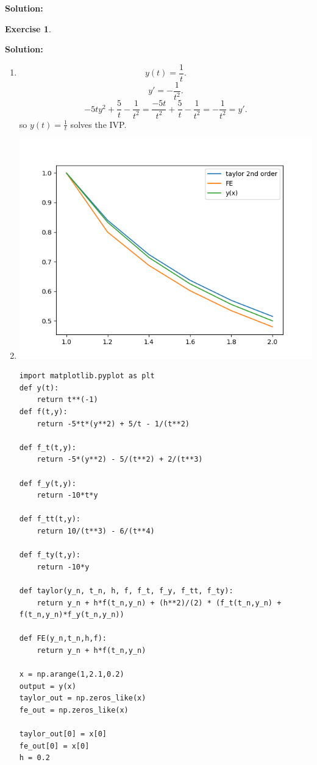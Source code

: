 \documentclass[a4paper,12pt]{scrartcl} %
\newenvironment{solution}
  {\par\color{answercolor}\textbf{Solution:}\ }
  {\par}
\newcounter{customcounter}
\theoremstyle{darktheorem}
\newtheorem{exercise}[customcounter]{Exercise}
\begin{document}
\begin{solution}
\begin{exercise}
    \end{exercise}
    \begin{solution}
        \begin{enumerate}
            \item
            \[
           y(t) = \frac{1}{t}
           .\]  
           \[
           y' = -\frac{1}{t^2}
           .\] 
           \[
           -5ty^2 + \frac{5}{t} -\frac{1}{t^2} = \frac{-5t}{t^2} + \frac{5}{t} -\frac{1}{t^2} = -\frac{1}{t^2} = y'
           .\] 
           so $y(t) = \frac{1}{t}$ solves the IVP.
       \item 
           \includegraphics{output.png}
           \begin{lstlisting}
import matplotlib.pyplot as plt
def y(t):
    return t**(-1)
def f(t,y):
    return -5*t*(y**2) + 5/t - 1/(t**2)

def f_t(t,y):
    return -5*(y**2) - 5/(t**2) + 2/(t**3)

def f_y(t,y):
    return -10*t*y

def f_tt(t,y):
    return 10/(t**3) - 6/(t**4)

def f_ty(t,y):
    return -10*y

def taylor(y_n, t_n, h, f, f_t, f_y, f_tt, f_ty):
    return y_n + h*f(t_n,y_n) + (h**2)/(2) * (f_t(t_n,y_n) + f(t_n,y_n)*f_y(t_n,y_n))

def FE(y_n,t_n,h,f):
    return y_n + h*f(t_n,y_n)

x = np.arange(1,2.1,0.2)
output = y(x)
taylor_out = np.zeros_like(x)
fe_out = np.zeros_like(x)

taylor_out[0] = x[0]
fe_out[0] = x[0]
h = 0.2


\end{lstlisting}
\end{enumerate}
\end{solution}
\end{solution}
\end{document}
